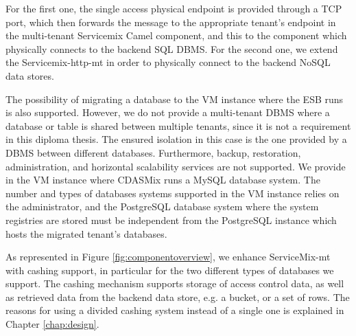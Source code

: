For the first one, the single access physical endpoint is provided through a \ac{TCP} port, which then forwards the message to the appropriate tenant's endpoint in the multi-tenant Servicemix Camel component, and this to the component which physically connects to the backend \ac{SQL} \ac{DBMS}. For the second one, we extend the Servicemix-http-mt in order to physically connect to the backend \ac{NoSQL} data stores. 

The possibility of migrating a database to the VM instance where the \ac{ESB} runs is also supported. However, we do not provide a multi-tenant \ac{DBMS} where a database or table is shared between multiple tenants, since it is not a requirement in this diploma thesis. The ensured isolation in this case is the one provided by a \ac{DBMS} between different databases. Furthermore, backup, restoration, administration, and horizontal scalability services are not supported. We provide in the VM instance where CDASMix runs a MySQL database system. The number and types of databases systems supported in the VM instance relies on the administrator, and the PostgreSQL database system where the system registries are stored must be independent from the PostgreSQL instance which hosts the migrated tenant's databases.

As represented in Figure \ref{fig:componentoverview}, we enhance ServiceMix-mt with cashing support, in particular for the two different types of databases we support. The cashing mechanism supports storage of access control data, as well as retrieved data from the backend data store, e.g. a bucket, or a set of rows. The reasons for using a divided cashing system instead of a single one is explained in Chapter \ref{chap:design}. 

\FloatBarrier